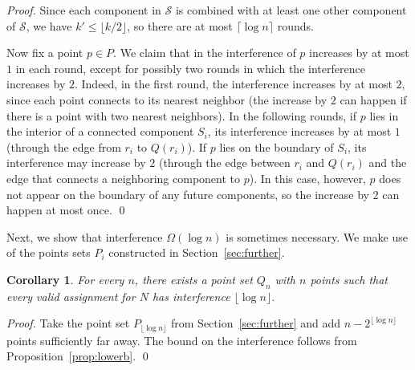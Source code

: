 \documentclass[envcountsect,envcountsame,runningheads,a4paper]{llncs}
\newtheorem{corol}[theorem]{Corollary}
\begin{document}
\begin{proof}
Since each component in $\mathcal{S}$ is combined with at least one
other component of $\mathcal{S}$, we have $k' \leq \lfloor k/2 \rfloor$,
so there are at most $\lceil \log n \rceil$ rounds.

Now fix a point $p \in P$. We claim that in the interference
of $p$ increases by at most $1$ in each round, except for
possibly two rounds in which the interference increases by $2$.
Indeed, in the first round, the interference increases by at most $2$,
since each point connects to its nearest neighbor (the increase by $2$ can
happen if there is a point with two nearest neighbors).
In the following rounds, if $p$ lies in the interior of a connected component $S_i$,
its interference increases by at most $1$ (through the edge from
$r_i$ to $Q(r_i)$). If $p$ lies on the boundary of
$S_i$, its interference may increase by $2$ (through the edge between
$r_i$ and $Q(r_i)$ and the edge that connects a neighboring component
to $p$). In this case, however, $p$ does not appear on the boundary of
any future components, so the increase by $2$ can happen at most once.
\qed{}
\end{proof}


Next, we show that interference
$\Omega(\log n)$ is sometimes necessary.
We make use of the points sets $P_i$ constructed in Section~\ref{sec:further}.


\begin{corol}
For every $n$, there exists a point set $Q_n$ with $n$ points such that
every valid assignment for $N$ has interference $\lfloor \log n \rfloor$.
\end{corol}

\begin{proof}
Take the point set $P_{\lfloor \log n \rfloor}$ from Section~\ref{sec:further} and add
$n - 2^{\lfloor \log n \rfloor}$ points sufficiently far away.
The bound on the interference follows from Proposition~\ref{prop:lowerb}.
\qed{}
\end{proof}
\end{document}
